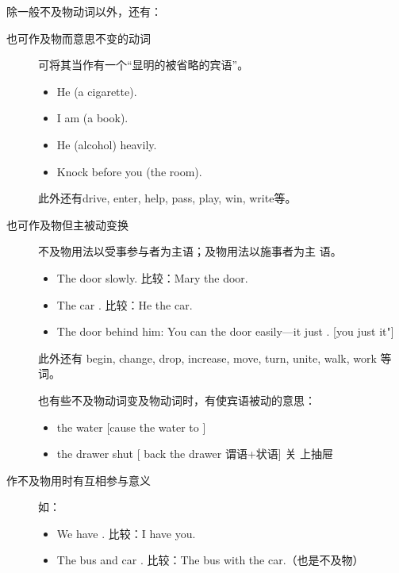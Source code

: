 除一般不及物动词以外，还有：
\begin{description}
\item[也可作及物而意思不变的动词] 可将其当作有一个“显明的被省略的宾语”。
  \begin{itemize}
  \item He  (a cigarette).

  \item I am  (a book).

  \item He  (alcohol) heavily.

  \item Knock before you  (the room).
  \end{itemize}此外还有drive, enter, help, pass, play, win, write等。

\item[也可作及物但主被动变换] 不及物用法以受事参与者为主语；及物用法以施事者为主
语。
  \begin{itemize}
  \item The door  slowly. 比较：Mary  the door.

  \item The car . 比较：He  the car.

  \item The door  behind him: You can  the door
easily---it just . [you just  it"]
  \end{itemize}此外还有 begin, change, drop, increase, move, turn, unite, walk,
work 等词。

  也有些不及物动词变及物动词时，有使宾语被动的意思：
  \begin{itemize}
  \item {} the water [cause the water to ]

  \item {} the drawer shut [ back the drawer 谓语+状语] 关
上抽屉
  \end{itemize}

\item[作不及物用时有互相参与意义] 如：
  \begin{itemize}
  \item We have . 比较：I have  you.

  \item The bus and car . 比较：The bus  with the
car.（也是不及物）
  \end{itemize}
\end{description}

